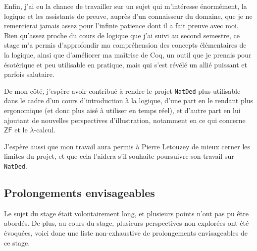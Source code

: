 \documentclass[a4paper]{article}
\newcommand{\ZF}{\mathsf{ZF}}
\begin{document}
Enfin, j'ai eu la chance de travailler sur un sujet qui m'intéresse énormément, la logique et les assistants de preuve, auprès d'un connaisseur du domaine, que je ne remercierai jamais assez pour l'infinie patience dont il a fait preuve avec moi. Bien qu'assez proche du cours de logique que j'ai suivi au second semestre, ce stage m'a permis d'approfondir ma compréhension des concepts élémentaires de la logique, ainsi que d'améliorer ma maîtrise de Coq, un outil que je prenais pour ésotérique et peu utilisable en pratique, mais qui s'est révélé un allié puissant et parfois salutaire.
\medskip

De mon côté, j'espère avoir contribué à rendre le projet \verb+NatDed+ plus utilisable dans le cadre d'un cours d'introduction à la logique, d'une part en le rendant plus ergonomique (et donc plus aisé à utiliser en temps réel), et d'autre part en lui ajoutant de nouvelles perspectives d'illustration, notamment en ce qui concerne $\ZF$ et le $\lambda$-calcul.

J'espère aussi que mon travail aura permis à Pierre Letouzey de mieux cerner les limites du projet, et que cela l'aidera s'il souhaite poursuivre son travail sur \verb+NatDed+.

\subsection*{Prolongements envisageables}

Le sujet du stage était volontairement long, et plusieurs points n'ont pas pu être abordés. De plus, au cours du stage, plusieurs perspectives non explorées ont été évoquées, voici donc une liste non-exhaustive de prolongements envisageables de ce stage.
\end{document}
